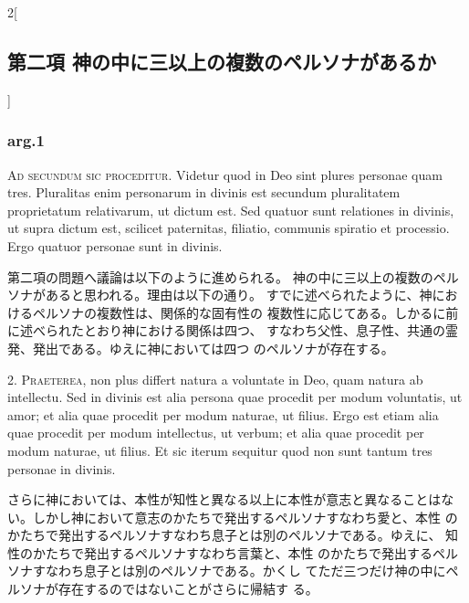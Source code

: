 \documentclass[paper=a4paper,fontsize=10pt,jafontsize=9pt,titlepage]{jlreq}
\begin{document}


\begin{paracol}{2}[\subsection{第二項 神の中に三以上の複数のペルソナがあるか}]

\subsubsection{arg.1}

{\scshape Ad secundum sic proceditur}. Videtur quod in Deo sint plures personae
quam tres. Pluralitas enim personarum in divinis est secundum
pluralitatem proprietatum relativarum, ut dictum est. Sed quatuor sunt
relationes in divinis, ut supra dictum est, scilicet paternitas,
filiatio, communis spiratio et processio. Ergo quatuor personae sunt
in divinis.


\switchcolumn


第二項の問題へ議論は以下のように進められる。
神の中に三以上の複数のペルソナがあると思われる。理由は以下の通り。
すでに述べられたように、神におけるペルソナの複数性は、関係的な固有性の
 複数性に応じてある。しかるに前に述べられたとおり神における関係は四つ、
 すなわち父性、息子性、共通の霊発、発出である。ゆえに神においては四つ
 のペルソナが存在する。




2. {\scshape Praeterea}, non plus differt natura a voluntate in Deo, quam natura ab
intellectu. Sed in divinis est alia persona quae procedit per modum
voluntatis, ut amor; et alia quae procedit per modum naturae, ut
filius. Ergo est etiam alia quae procedit per modum intellectus, ut
verbum; et alia quae procedit per modum naturae, ut filius. Et sic
iterum sequitur quod non sunt tantum tres personae in divinis.


\switchcolumn


さらに神においては、本性が知性と異なる以上に本性が意志と異なることはな
 い。しかし神において意志のかたちで発出するペルソナすなわち愛と、本性
 のかたちで発出するペルソナすなわち息子とは別のペルソナである。ゆえに、
 知性のかたちで発出するペルソナすなわち言葉と、本性
 のかたちで発出するペルソナすなわち息子とは別のペルソナである。かくし
 てただ三つだけ神の中にペルソナが存在するのではないことがさらに帰結す
 る。



\end{paracol}
\end{document}
